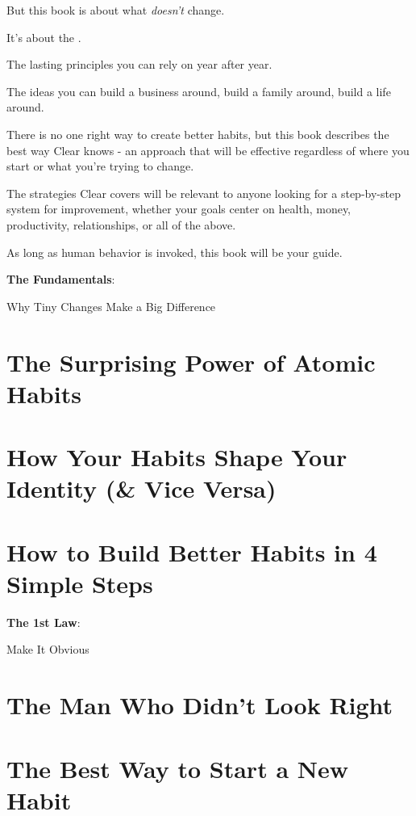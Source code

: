 \documentclass[oneside]{article}
\numberwithin{equation}{section}
\begin{document}
But this book is about what \textit{doesn't} change.

It's about the .

The lasting principles you can rely on year after year.

The ideas you can build a business around, build a family around, build a life around.

%
There is no one right way to create better habits, but this book describes the best way Clear knows - an approach that will be effective regardless of where you start or what you're trying to change.

The strategies Clear covers will be relevant to anyone looking for a step-by-step system for improvement, whether your goals center on health, money, productivity, relationships, or all of the above.

As long as human behavior is invoked, this book will be your guide.

\begin{center}\huge
    \textbf{The Fundamentals}:
    
    Why Tiny Changes Make a Big Difference
\end{center}

\section{The Surprising Power of Atomic Habits}

\section{How Your Habits Shape Your Identity (\& Vice Versa)}

\section{How to Build Better Habits in 4 Simple Steps}

\begin{center}\huge
    \textbf{The 1st Law}:
    
    Make It Obvious
\end{center}

\section{The Man Who Didn't Look Right}

\section{The Best Way to Start a New Habit}
\end{document}
